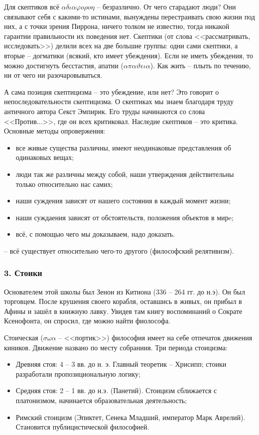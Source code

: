 \documentclass[a4paper, 12pt]{book} %
\begin{document}
Для скептиков всё $\alpha \delta \iota \alpha \varphi o \rho o \eta$ -- безразлично. От чего старадают люди? Они связывают себя с какими-то истинами, вынуждены перестраивать свою жизни под  них, а с точки зрения Пиррона, ничего толком не известно, тогда никакой гарантии правильности их поведения нет. Скептики (от слова <<рассматривать, исследовать>>) делили всех на две большие группы: одни сами скептики, а вторые -- догматики (всякий, кто имеет убеждения). Если не иметь убеждения, то можно достигнуть бесстастия, апатии ($\alpha \pi \alpha \vartheta \epsilon \iota \alpha$). Как жить -- плыть по течению, ни от чего ни разочаровываться. 

А сама позиция скептицизма -- это убеждение, или нет? Это говорит о непоследовательности скептицизма. О скептиках мы знаем благодаря труду античного автора Секст Эмпирик. Его труды начинаются со слова <<Против...>>, где он всех критиковал. Наследие скептиков -- это критика. Основные методы опровержения:
\begin{itemize}
\item  все живые существа различны, имеют неодинаковые представления об одинаковых вещах;
\item люди так же различны между собой, наши утверждения действительны только относительно нас самих;
\item наши суждения зависят от нашего состояния в каждый момент жизни;
\item наши суждаения зависят от обстоятельств, положения объектов в мирe;
\item всё, с помощью чего мы доказываем, надо доказать.
\end{itemize}
-- всё существует относительно чего-то другого (философский релятивизм).

\subsubsection*{3. Стоики}
Основателем этой школы был Зенон из Китиона (336 -- 264 гг. до н.э). Он был торговцем. После крушения своего корабля, оставшись в живых, он прибыл в Афины и зашёл в книжную лавку. Увидев там книгу воспоминаний о Сократе Ксенофонта, он спросил, где можно найти фиолософа.

Стоическая ($\sigma\omega\alpha$ -- <<портик>>) философия имеет на себе отпечаток движения киников. Движение названо по месту собраниия.
Три периода стоицизма:
\begin{itemize}
\item Древняя стоя: 4 -- 3 вв. до н. э. Главный теоретик -- Хрисипп; стоики разработали пропозициональную логику;
\item  Средняя стоя: 2 -- 1 вв. до н.э. (Панетий). Стоицизм сближается с платонизмом, начинается образовательная деятельность;
\item Римский стоицизм (Эпиктет, Сенека Младший, император Марк Аврелий). Становится публицистической философией.
\end{itemize}
\end{document}

